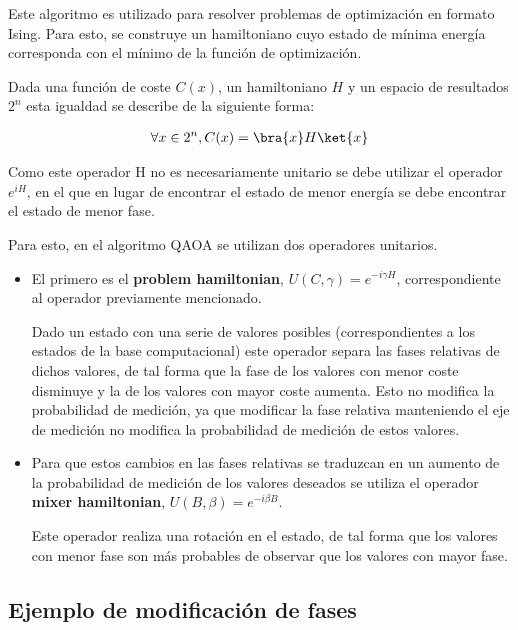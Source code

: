 Este algoritmo es utilizado para resolver problemas de optimización en formato Ising.  %
Para esto, se construye un hamiltoniano cuyo estado de mínima energía corresponda con el mínimo de la función de optimización.

Dada una función de coste $C(x)$, un hamiltoniano $H$ y un espacio de resultados $2^{n}$ esta igualdad se describe de la siguiente forma:

\begin{align*}
  \forall{x \in 2^{n}}, C(x) = \bra{x}H\ket{x}
\end{align*}

Como este operador H no es necesariamente unitario se debe utilizar el operador $e^{iH}$,  %
en el que en lugar de encontrar el estado de menor energía se debe encontrar el estado de menor fase.  %

Para esto, en el algoritmo QAOA se utilizan dos operadores unitarios.
\begin{itemize}
\item El primero es el \textbf{problem hamiltonian}, $U(C, \gamma) = e^{-i \gamma H}$, correspondiente al operador previamente mencionado.

  Dado un estado con una serie de valores posibles (correspondientes a los estados de la base computacional) este operador separa las fases relativas de dichos valores, de tal forma que la fase de los valores con menor coste disminuye y la de los valores con mayor coste aumenta. Esto no modifica la probabilidad de medición, ya que modificar la fase relativa manteniendo el eje de medición no modifica la probabilidad de medición de estos valores.

\item Para que estos cambios en las fases relativas se traduzcan en un aumento de la probabilidad de medición de los valores deseados se utiliza el operador \textbf{mixer hamiltonian}, $U(B, \beta) = e^{-i \beta B}$.

  Este operador realiza una rotación en el estado, de tal forma que los valores con menor fase son más probables de observar que los valores con mayor fase.

\end{itemize}

\subsection{Ejemplo de modificación de fases}
\label{sec:2-ejemplo de modificacion de fases}

